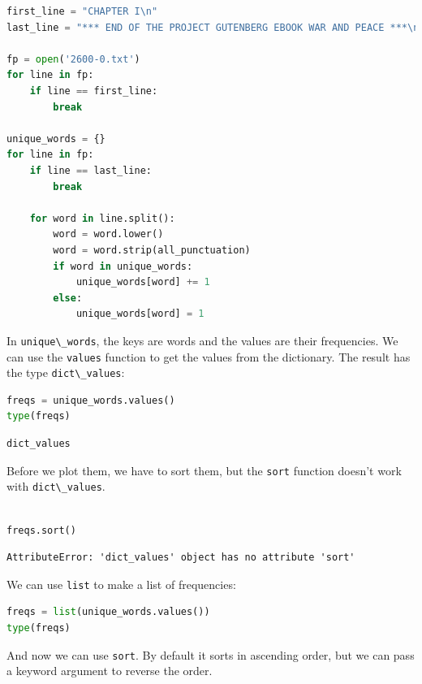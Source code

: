 \begin{lstlisting}[language=Python,style=source]
first_line = "CHAPTER I\n"
last_line = "*** END OF THE PROJECT GUTENBERG EBOOK WAR AND PEACE ***\n"

fp = open('2600-0.txt')
for line in fp:
    if line == first_line:
        break

unique_words = {}
for line in fp:
    if line == last_line:
        break
        
    for word in line.split():
        word = word.lower()
        word = word.strip(all_punctuation)
        if word in unique_words:
            unique_words[word] += 1
        else:
            unique_words[word] = 1
\end{lstlisting}

In \passthrough{\lstinline!unique\_words!}, the keys are words and the
values are their frequencies. We can use the
\passthrough{\lstinline!values!} function to get the values from the
dictionary. The result has the type
\passthrough{\lstinline!dict\_values!}:

\begin{lstlisting}[language=Python,style=source]
freqs = unique_words.values()
type(freqs)
\end{lstlisting}

\begin{lstlisting}[style=output]
dict_values
\end{lstlisting}

Before we plot them, we have to sort them, but the
\passthrough{\lstinline!sort!} function doesn't work with
\passthrough{\lstinline!dict\_values!}.

\begin{lstlisting}[language=Python,style=source]
%%expect AttributeError

freqs.sort()
\end{lstlisting}

\begin{lstlisting}[style=output]
AttributeError: 'dict_values' object has no attribute 'sort'
\end{lstlisting}

We can use \passthrough{\lstinline!list!} to make a list of frequencies:

\begin{lstlisting}[language=Python,style=source]
freqs = list(unique_words.values())
type(freqs)
\end{lstlisting}

And now we can use \passthrough{\lstinline!sort!}. By default it sorts
in ascending order, but we can pass a keyword argument to reverse the
order.


